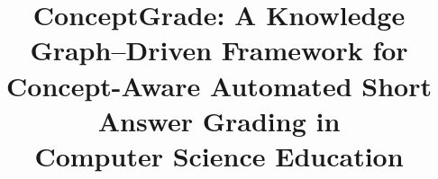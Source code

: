 \documentclass[conference]{IEEEtran}
\begin{document}
\title{ConceptGrade: A Knowledge Graph–Driven Framework for\\
       Concept-Aware Automated Short Answer Grading in\\
       Computer Science Education}

\author{
}

\maketitle
\end{document}
